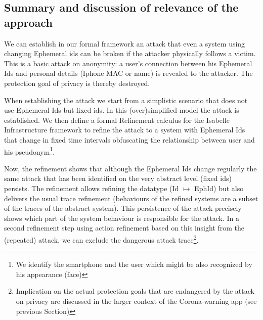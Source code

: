 \documentclass{llncs}
\begin{document}
\subsection{Summary and discussion of relevance of the approach}
We can establish in our formal framework an attack that even a system using changing
Ephemeral ids can be broken if the attacker physically follows a victim. This is a basic attack on
anonymity: a user's connection between his Ephemeral Ids and personal details (Iphone MAC or name)
is revealed to the attacker. The protection goal of privacy is thereby destroyed.

When establishing the attack we start from a simplistic scenario that does not use Ephemeral Ids but fixed ids.
In this (over)simplified model the attack is established. We then define a formal Refinement calculus for
the Isabelle Infrastructure framework to refine the attack to a system with Ephemeral Ids that change in fixed
time intervals obfuscating the relationship between user and his pseudonym\footnote{We identify the smartphone
  and the user which might be also recognized by his appearance (face)}.

Now, the refinement shows that although the Ephemeral Ids change regularly the same attack that has been
identified on the very abstract level (fixed ids) persists.
The refinement allows refining the datatype (Id $\mapsto$ EphId) but also delivers the usual trace
refinement (behaviours of the refined systems are a subset of the traces of the abstract system).
This persistence of the attack precisely shows which part of the system behaviour is responsible for the
attack. In a second refinement step using action refinement based on this insight from the (repeated)
attack, we can exclude the dangerous attack trace\footnote{Implication on the actual protection goals
  that are endangered by the attack on privacy are discussed in the larger context of the Corona-warning
  app (see previous Section)}.
\end{document}
